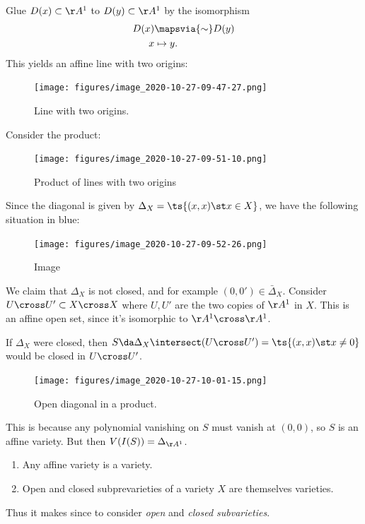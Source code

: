 \begin{example}

Glue \(D(x) \subset \AA^1\) to \(D(y) \subset \AA^1\) by the isomorphism
\begin{align*}  
D(x) & \mapsvia{\sim} D(y) \\
x &\mapsto y
.\end{align*} This yields an affine line with two origins:

\begin{figure}
\centering
\texttt{[image: figures/image\_2020-10-27-09-47-27.png]}
\caption{Line with two origins.}
\end{figure}

Consider the product:

\begin{figure}
\centering
\texttt{[image: figures/image\_2020-10-27-09-51-10.png]}
\caption{Product of lines with two origins}
\end{figure}

Since the diagonal is given by \(\Delta_X = \ts{(x, x) \st x\in X}\), we
have the following situation in blue:

\begin{figure}
\centering
\texttt{[image: figures/image\_2020-10-27-09-52-26.png]}
\caption{Image}
\end{figure}

We claim that \(\Delta_X\) is not closed, and for example
\((0, 0') \in \bar{\Delta}_X\). Consider
\(U\cross U' \subset X\cross X\) where \(U, U'\) are the two copies of
\(\AA^1\) in \(X\). This is an affine open set, since it's isomorphic to
\(\AA^1\cross \AA^1\).

If \(\Delta_X\) were closed, then
\(S \da \Delta_X \intersect (U\cross U') = \ts{(x, x) \st x\neq 0}\)
would be closed in \(U\cross U'\).

\begin{figure}
\centering
\texttt{[image: figures/image\_2020-10-27-10-01-15.png]}
\caption{Open diagonal in a product.}
\end{figure}

This is because any polynomial vanishing on \(S\) must vanish at
\((0, 0)\), so \(S\) is an affine variety. But then
\(V(I(S)) = \Delta_{\AA^1}\).

\end{example}

\begin{lemma}[?]

\hfill

\begin{enumerate}
\def\labelenumi{\alph{enumi}.}
\item
  Any affine variety is a variety.
\item
  Open and closed subprevarieties of a variety \(X\) are themselves
  varieties.
\end{enumerate}

Thus it makes since to consider \emph{open} and \emph{closed
subvarieties}.

\end{lemma}

